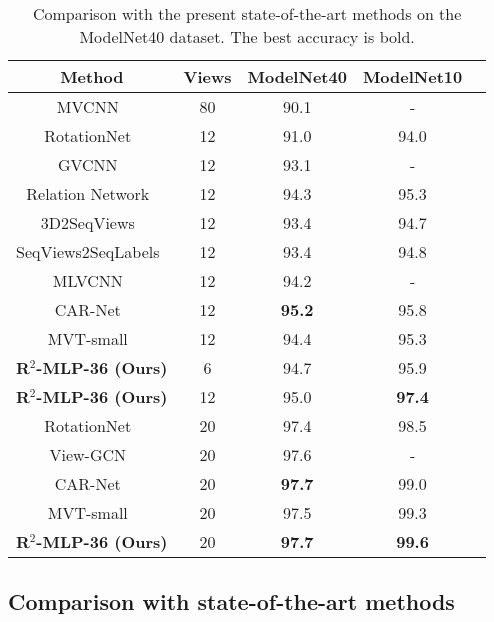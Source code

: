 \documentclass[11pt]{article}
\begin{document}
\begin{table*}[t!]
\caption{Comparison with the present state-of-the-art methods on the ModelNet40 dataset. The best accuracy is bold.}\label{tab:sota}
\centering
\begin{tabular}{ccccc}
\toprule
Method & Views & ModelNet40 & ModelNet10 \\
\midrule
MVCNN~\citep{su2015multi} & 80 & 90.1  & - \\
RotationNet~\citep{kanezaki2018rotationnet} & 12 & 91.0 & 94.0 \\
GVCNN~\citep{feng2018gvcnn} & 12 & 93.1 & - \\
Relation Network~\citep{yang2019learning} & 12 & 94.3 & 95.3 \\
3D2SeqViews~\citep{han20193d2seqvies} & 12 & 93.4 & 94.7 \\
SeqViews2SeqLabels~\citep{han2019seqview2seqlabels} & 12 & 93.4 & 94.8 \\
MLVCNN~\citep{jiang2019mlvcnn} & 12 & 94.2 & - \\
CAR-Net~\citep{xu2021multi} & 12 & \textbf{95.2} & 95.8 \\
MVT-small~\citep{chen2021mvt} & 12 & 94.4 & 95.3 \\
\rowcolor{mygray} {\textbf{R$^2$-MLP-36 (Ours)}} & 6 & 94.7 & 95.9 \\
\rowcolor{mygray} {\textbf{R$^2$-MLP-36 (Ours)}} & 12 & 95.0  & \textbf{97.4} \\
RotationNet~\citep{kanezaki2018rotationnet}& 20 & 97.4 & 98.5 \\
View-GCN~\citep{wei2020view} & 20 & 97.6 & - \\
CAR-Net~\citep{xu2021multi} & 20 & \textbf{97.7} & 99.0 \\
MVT-small~\citep{chen2021mvt} & 20 & 97.5 & 99.3 \\
\rowcolor{mygray} {\textbf{R$^2$-MLP-36 (Ours)}} & 20 & \textbf{97.7} & \textbf{99.6} \\
\bottomrule
\end{tabular}
\end{table*}

\newpage

\subsection{Comparison with state-of-the-art methods}
\end{document}
